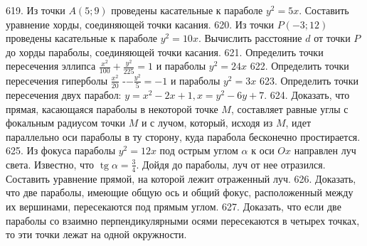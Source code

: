 619. Из точки $A(5 ; 9)$ проведены касательные к параболе $y^2=5 x$. Составить уравнение хорды, соединяющей точки касания.
620. Из точки $P(-3 ; 12)$ проведены касательные к параболе $y^2=10 x$. Вычислить расстояние $d$ от точки $P$ до хорды параболы, соединяющей точки касания.
621. Определить точки пересечения эллипса $\frac{x^2}{100}+\frac{y^2}{225}=1$ и параболы $y^2=24 x$
622. Определить точки пересечения гиперболы $\frac{x^2}{20}$ -$-\frac{y^2}{5}=-1$ и параболы $y^2=3 x$
623. Определить точки пересечения двух парабол: $y=x^2-2 x+1, x=y^2-6 y+7$.
624. Доказать, что прямая, касающаяся параболы в некоторой точке $M$, составляет равные углы с фокальным радиусом точки $M$ и с лучом, который, исходя из $M$, идет параллельно оси параболы в ту сторону, куда парабола бесконечно простирается.
625. Из фокуса параболы $y^2=12 x$ под острым углом $\alpha$ к оси $O x$ направлен луч света. Известно, что $\operatorname{tg} \alpha=\frac{3}{4}$. Дойдя до параболы, луч от нее отразился. Составить уравнение прямой, на которой лежит отраженный луч.
626. Доказать, что две параболы, имеющие общую ось и общий фокус, расположенный между их вершинами, пересекаются под прямым углом.
627. Доказать, что если две параболы со взаимно перпендикулярными осями пересекаются в четырех точках, то эти точки лежат на одной окружности.

